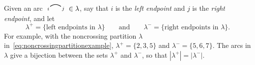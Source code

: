 \documentclass[submission]{FPSAC2024}
\newtheorem{lem}[equation]{Lemma}
\theoremstyle{definition}
\theoremstyle{remark}
\numberwithin{equation}{section}
\newcommand{\edge}[2]{\tikz[scale = 0.75, baseline = -0.2cm]{
\draw (0.1, 0) node[inner sep = 0ex] (a) {};
\node[left, xshift = 0.1cm, yshift = -0.1cm] at (a) {$\scriptstyle #1$};
\draw (0.9, 0)  node[inner sep = 0ex] (b) {};
\node[right, xshift = -0.1cm, yshift = -0.1cm] at (b) {$\scriptstyle #2$};
\draw[thick] (a) to[out = 35, in = 145] (b);}}
\begin{document}
Given an arc $ \edge{i}{j} \in \lambda$, say that $i$ is the \emph{left endpoint} and $j$ is the \emph{right endpoint}, and let
\[
\lambda^{+} = \{\text{left endpoints in $\lambda$}\}
\qquad\text{and}\qquad
\lambda^{-} = \{\text{right endpoints in $\lambda$}\}.
\]
%
%
For example, with the noncrossing partition $\lambda$ in~\eqref{eq:noncrossingpartitionexample}, $\lambda^{+} = \{2, 3, 5\}$ and $\lambda^{-} = \{5, 6, 7\}$.  The arcs in $\lambda$ give a bijection between the sets $\lambda^{+}$ and $\lambda^{-}$, so that $|\lambda^{+}| = |\lambda^{-}|.$

\end{document}
